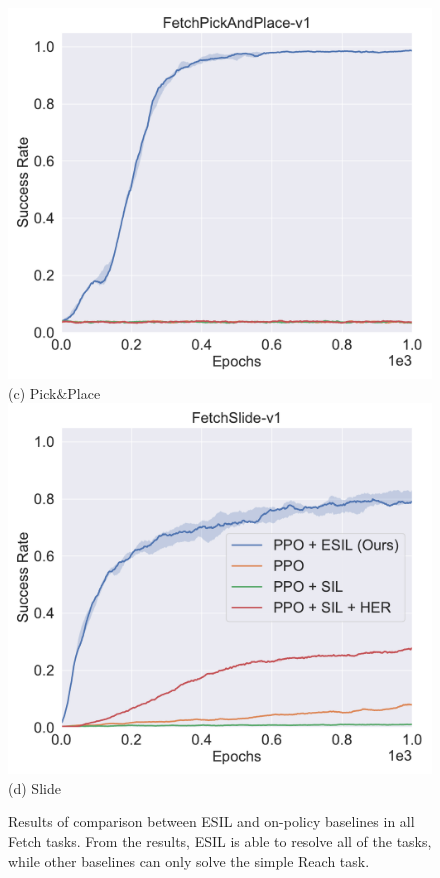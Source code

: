 \begin{figure}[h!]
  \includegraphics[width=\linewidth]{figures/chapter3/pick_baseline.pdf}
  ({c}) Pick$\&$Place
\endminipage
{}%
  \centering
  \includegraphics[width=\linewidth]{figures/chapter3/slide_baseline.pdf}
  ({d}) Slide
\endminipage\hfill
\caption[Results of ESIL in the robotic manipulation environment.]{Results of comparison between ESIL and on-policy baselines in all Fetch tasks. From the results, ESIL is able to resolve all of the tasks, while other baselines can only solve the simple Reach task.}
\label{fig:baseline_compare}
\end{figure}

